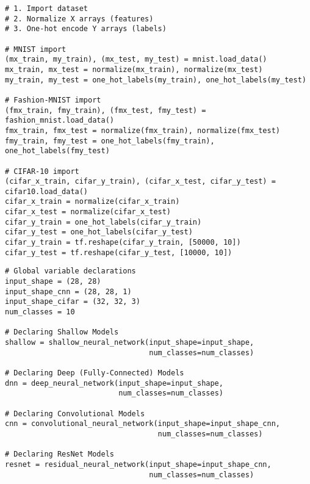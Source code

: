 \documentclass{article} %
\begin{document}
\lstset{language=Python}
\lstset{frame=lines}
\lstset{basicstyle=\footnotesize}
\begin{lstlisting}
# 1. Import dataset
# 2. Normalize X arrays (features)
# 3. One-hot encode Y arrays (labels)

# MNIST import
(mx_train, my_train), (mx_test, my_test) = mnist.load_data()
mx_train, mx_test = normalize(mx_train), normalize(mx_test)
my_train, my_test = one_hot_labels(my_train), one_hot_labels(my_test)

# Fashion-MNIST import
(fmx_train, fmy_train), (fmx_test, fmy_test) = fashion_mnist.load_data()
fmx_train, fmx_test = normalize(fmx_train), normalize(fmx_test)
fmy_train, fmy_test = one_hot_labels(fmy_train), one_hot_labels(fmy_test)

# CIFAR-10 import
(cifar_x_train, cifar_y_train), (cifar_x_test, cifar_y_test) = cifar10.load_data()
cifar_x_train = normalize(cifar_x_train)
cifar_x_test = normalize(cifar_x_test)
cifar_y_train = one_hot_labels(cifar_y_train)
cifar_y_test = one_hot_labels(cifar_y_test)
cifar_y_train = tf.reshape(cifar_y_train, [50000, 10])
cifar_y_test = tf.reshape(cifar_y_test, [10000, 10])
\end{lstlisting}

\lstset{language=Python}
\lstset{frame=lines}
\lstset{basicstyle=\footnotesize}
\begin{lstlisting}
# Global variable declarations
input_shape = (28, 28)
input_shape_cnn = (28, 28, 1)
input_shape_cifar = (32, 32, 3)
num_classes = 10

# Declaring Shallow Models
shallow = shallow_neural_network(input_shape=input_shape, 
                                 num_classes=num_classes)
                                        
# Declaring Deep (Fully-Connected) Models
dnn = deep_neural_network(input_shape=input_shape, 
                          num_classes=num_classes)
                                 
# Declaring Convolutional Models
cnn = convolutional_neural_network(input_shape=input_shape_cnn, 
                                   num_classes=num_classes)

# Declaring ResNet Models
resnet = residual_neural_network(input_shape=input_shape_cnn, 
                                 num_classes=num_classes)
\end{lstlisting}
\end{document}
